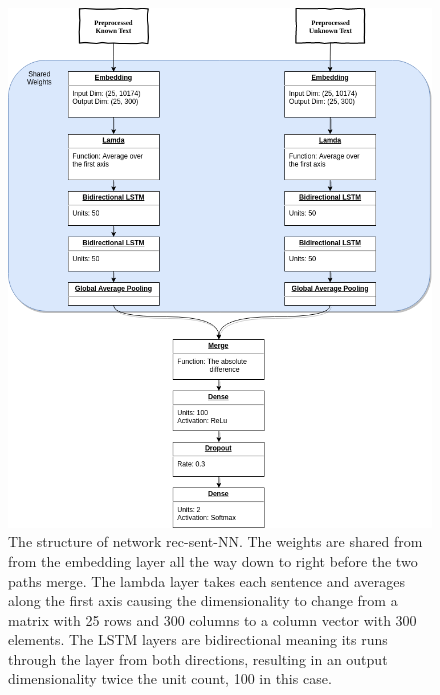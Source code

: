 \begin{figure}
    \centering
    \includegraphics[width=\textwidth]{./pictures/experiments/rec_sent_nn/model.png}
    \caption{The structure of network \gls{rec-sent-NN}. The weights are shared
        from from the embedding layer all the way down to right before the two
        paths merge. The lambda layer takes each sentence and averages along
        the first axis causing the dimensionality to change from a matrix with
        25 rows and 300 columns to a column vector with 300 elements. The LSTM
        layers are bidirectional meaning its runs through the layer from both
        directions, resulting in an output dimensionality twice the unit count,
        100 in this case.
    \label{fig:rec-sent-NN}}
\end{figure}

